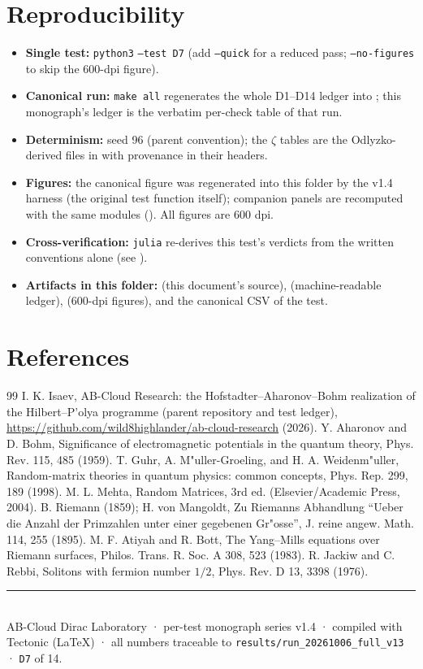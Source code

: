 \documentclass[11pt,a4paper]{article}
\begin{document}
\section{Reproducibility}
\begin{itemize}[leftmargin=1.2em, itemsep=0.15em]
\item \textbf{Single test:} \texttt{python3}  \texttt{--test D7} (add \texttt{--quick} for a reduced pass; \texttt{--no-figures} to skip the 600-dpi figure).
\item \textbf{Canonical run:} \texttt{make all} regenerates the whole D1--D14 ledger into ; this monograph's ledger is the verbatim per-check table of that run.
\item \textbf{Determinism:} seed 96 (parent convention); the $\zeta$ tables are the Odlyzko-derived files in  with provenance in their headers.
\item \textbf{Figures:} the canonical figure was regenerated into this folder by the v1.4 harness (the original test function itself); companion panels are recomputed with the same modules (). All figures are 600 dpi.
\item \textbf{Cross-verification:} \texttt{julia}  re-derives this test's verdicts from the written conventions alone (see ).
\item \textbf{Artifacts in this folder:}  (this document's source),  (machine-readable ledger),  (600-dpi figures), and the canonical CSV of the test.
\end{itemize}

\section*{References}
\begin{thebibliography}{99}\small
{} I. K. Isaev, AB-Cloud Research: the Hofstadter--Aharonov--Bohm realization of the Hilbert--P'olya programme (parent repository and test ledger), \url{https://github.com/wild8highlander/ab-cloud-research} (2026).
 Y. Aharonov and D. Bohm, Significance of electromagnetic potentials in the quantum theory, Phys. Rev. 115, 485 (1959).
 T. Guhr, A. M"uller-Groeling, and H. A. Weidenm"uller, Random-matrix theories in quantum physics: common concepts, Phys. Rep. 299, 189 (1998).
 M. L. Mehta, Random Matrices, 3rd ed. (Elsevier/Academic Press, 2004).
 B. Riemann (1859); H. von Mangoldt, Zu Riemanns Abhandlung ``Ueber die Anzahl der Primzahlen unter einer gegebenen Gr"osse'', J. reine angew. Math. 114, 255 (1895).
 M. F. Atiyah and R. Bott, The Yang--Mills equations over Riemann surfaces, Philos. Trans. R. Soc. A 308, 523 (1983).
 R. Jackiw and C. Rebbi, Solitons with fermion number $1/2$, Phys. Rev. D 13, 3398 (1976).
\end{thebibliography}

\vfill
\noindent\rule{\textwidth}{0.4pt}\\[0.2em]
{\footnotesize\color{labgray} AB-Cloud Dirac Laboratory · per-test monograph series v1.4 · compiled with Tectonic (LaTeX) · all numbers traceable to \texttt{results/run\_20261006\_full\_v13} · \texttt{D7} of 14.}
\end{document}
